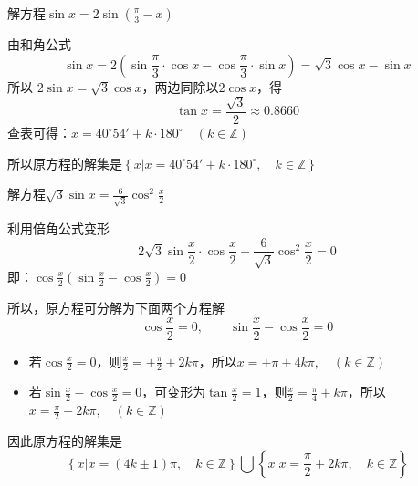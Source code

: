 \begin{example}
    解方程$\sin x=2\sin\left(\frac{\pi}{3}-x\right)$
\end{example}

\begin{solution}
    由和角公式$$\sin x=2\left(\sin\frac{\pi}{3}\cdot \cos x-\cos\frac{\pi}{3}\cdot \sin x\right)=\sqrt{3}\cos x-\sin x$$
所以 $2\sin x=\sqrt{3}\cos x$，两边同除以$2\cos x$，得
\[\tan x=\frac{\sqrt{3}}{2}\approx 0.8660\]
查表可得：$x=40^{\circ}54'+k\cdot 180^{\circ}\quad (k\in\mathbb{Z})$

所以原方程的解集是$\left\{x \Big|x=40^{\circ}54'+k\cdot 180^{\circ},\quad k\in\mathbb{Z}\right\}$
\end{solution}


\begin{example}
    解方程$\sqrt{3}\sin x=\frac{6}{\sqrt{3}}\cos^2\frac{x}{2}$
\end{example}

\begin{solution}
利用倍角公式变形
\[2\sqrt{3}\sin\frac{x}{2}\cdot \cos\frac{x}{2}-\frac{6}{\sqrt{3}}\cos^2\frac{x}{2}=0  \]
即：$\cos\frac{x}{2}\left(\sin\frac{x}{2}- \cos\frac{x}{2}\right)=0$

所以，原方程可分解为下面两个方程解
\[\cos\frac{x}{2}=0,\qquad \sin\frac{x}{2}-\cos\frac{x}{2}=0\]
\begin{itemize}
    \item 若$\cos\frac{x}{2}=0$，则$\frac{x}{2}=\pm\frac{\pi}{2}+2k\pi$，所以$x=\pm \pi+4k\pi,\quad (k\in\mathbb{Z})$
    \item 若$\sin\frac{x}{2}-\cos\frac{x}{2}=0$，可变形为$\tan\frac{x}{2}=1$，则$\frac{x}{2}=\frac{\pi}{4}+k\pi$，所以$x=\frac{\pi}{2}+2k\pi,\quad (k\in\mathbb{Z})$
\end{itemize}
因此原方程的解集是
\[\left\{x \Big|x=(4k\pm 1)\pi,\quad k\in\mathbb{Z}\right\}\bigcup \left\{x \Big|x=\frac{\pi}{2}+2k\pi,\quad k\in\mathbb{Z}\right\}\]
\end{solution}



